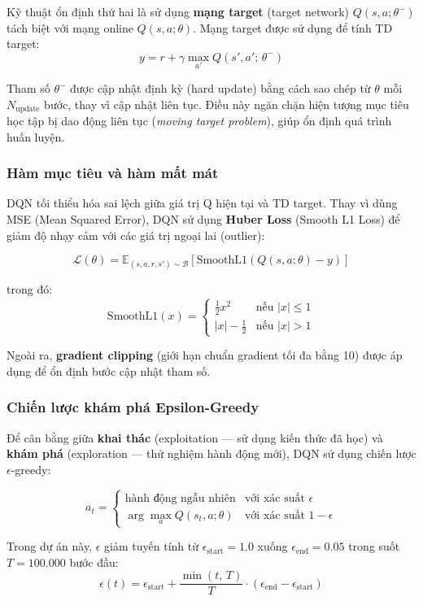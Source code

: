 Kỹ thuật ổn định thứ hai là sử dụng \textbf{mạng target} (target network) $Q(s, a; \theta^-)$ tách biệt với mạng online $Q(s, a; \theta)$. Mạng target được sử dụng để tính TD target:
\[
y = r + \gamma \max_{a'} Q(s', a';\, \theta^-)
\]

Tham số $\theta^-$ được cập nhật định kỳ (hard update) bằng cách sao chép từ $\theta$ mỗi $N_{\text{update}}$ bước, thay vì cập nhật liên tục. Điều này ngăn chặn hiện tượng mục tiêu học tập bị dao động liên tục (\textit{moving target problem}), giúp ổn định quá trình huấn luyện.

\subsubsection{Hàm mục tiêu và hàm mất mát}

DQN tối thiểu hóa sai lệch giữa giá trị Q hiện tại và TD target. Thay vì dùng MSE (Mean Squared Error), DQN sử dụng \textbf{Huber Loss} (Smooth L1 Loss) để giảm độ nhạy cảm với các giá trị ngoại lai (outlier):

\[
\mathcal{L}(\theta) = \mathbb{E}_{(s,a,r,s') \sim \mathcal{B}}\left[\text{SmoothL1}\!\left(Q(s,a;\theta) - y\right)\right]
\]

trong đó:
\[
\text{SmoothL1}(x) =
\begin{cases}
\frac{1}{2}x^2 & \text{nếu } |x| \leq 1 \\
|x| - \frac{1}{2} & \text{nếu } |x| > 1
\end{cases}
\]

Ngoài ra, \textbf{gradient clipping} (giới hạn chuẩn gradient tối đa bằng 10) được áp dụng để ổn định bước cập nhật tham số.

\subsubsection{Chiến lược khám phá Epsilon-Greedy}

Để cân bằng giữa \textbf{khai thác} (exploitation --- sử dụng kiến thức đã học) và \textbf{khám phá} (exploration --- thử nghiệm hành động mới), DQN sử dụng chiến lược $\epsilon$-greedy:

\[
a_t =
\begin{cases}
\text{hành động ngẫu nhiên} & \text{với xác suất } \epsilon \\
\arg\max_a Q(s_t, a;\theta) & \text{với xác suất } 1 - \epsilon
\end{cases}
\]

Trong dự án này, $\epsilon$ giảm tuyến tính từ $\epsilon_{\text{start}} = 1.0$ xuống $\epsilon_{\text{end}} = 0.05$ trong suốt $T = 100.000$ bước đầu:
\[
\epsilon(t) = \epsilon_{\text{start}} + \frac{\min(t,\, T)}{T} \cdot (\epsilon_{\text{end}} - \epsilon_{\text{start}})
\]

